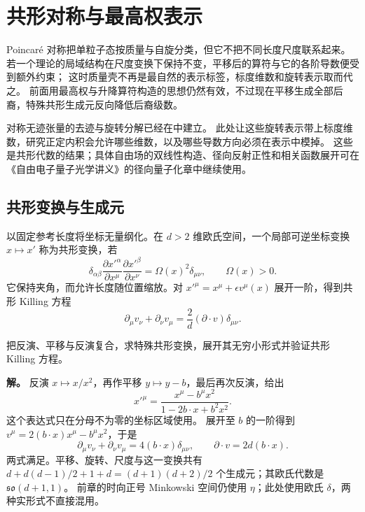\chapter{共形对称与最高权表示}
\label{chap:ghs-conformal-representation-ope}

Poincar\'e 对称把单粒子态按质量与自旋分类，但它不把不同长度尺度联系起来。
若一个理论的局域结构在尺度变换下保持不变，平移后的算符与它的各阶导数便受到额外约束；
这时质量壳不再是最自然的表示标签，标度维数和旋转表示取而代之。
前面用最高权与升降算符构造的思想仍然有效，不过现在平移生成全部后裔，特殊共形生成元反向降低后裔级数。

对称无迹张量的去迹与旋转分解已经在中建立。
此处让这些旋转表示带上标度维数，研究正定内积会允许哪些维数，以及哪些导数方向必须在表示中模掉。
这些是共形代数的结果；具体自由场的双线性构造、径向反射正性和相关函数展开可在《自由电子量子光学讲义》的径向量子化章中继续使用。

\section{共形变换与生成元}
\label{sec:ghs-conformal-algebra-unitarity}

\begin{definition}[欧氏共形变换]
以固定参考长度将坐标无量纲化。在 $d>2$ 维欧氏空间，一个局部可逆坐标变换 $x\mapsto x'$ 称为共形变换，若
\[
 \delta_{\alpha\beta}\frac{\partial x'^\alpha}{\partial x^\mu}
 \frac{\partial x'^\beta}{\partial x^\nu}=\Omega(x)^2\delta_{\mu\nu},\qquad\Omega(x)>0.
\]
它保持夹角，而允许长度随位置缩放。对 $x'^\mu=x^\mu+\epsilon v^\mu(x)$ 展开一阶，得到共形 Killing 方程
\begin{equation}\label{eq:ghs-conformal-killing}
 \partial_\mu v_\nu+\partial_\nu v_\mu
 =\frac{2}{d}(\partial\cdot v)\delta_{\mu\nu}.
\end{equation}
\end{definition}

\begin{example}[特殊共形变换的局部生成]
把反演、平移与反演复合，求特殊共形变换，展开其无穷小形式并验证共形 Killing 方程。

\textbf{解。} 反演 $x\mapsto x/x^2$，再作平移 $y\mapsto y-b$，最后再次反演，给出
\[
 x'^\mu=\frac{x^\mu-b^\mu x^2}{1-2b\cdot x+b^2x^2}.
\]
这个表达式只在分母不为零的坐标区域使用。
展开至 $b$ 的一阶得到 $v^\mu=2(b\cdot x)x^\mu-b^\mu x^2$，于是
\[
 \partial_\mu v_\nu+\partial_\nu v_\mu=4(b\cdot x)\delta_{\mu\nu},
 \qquad\partial\cdot v=2d(b\cdot x).
\]
两式满足。平移、旋转、尺度与这一变换共有
$d+d(d-1)/2+1+d=(d+1)(d+2)/2$ 个生成元；其欧氏代数是 $\mathfrak{so}(d+1,1)$。
前章的时向正号 Minkowski 空间仍使用 $\eta$；此处使用欧氏 $\delta$，两种实形式不直接混用。
\end{example}

